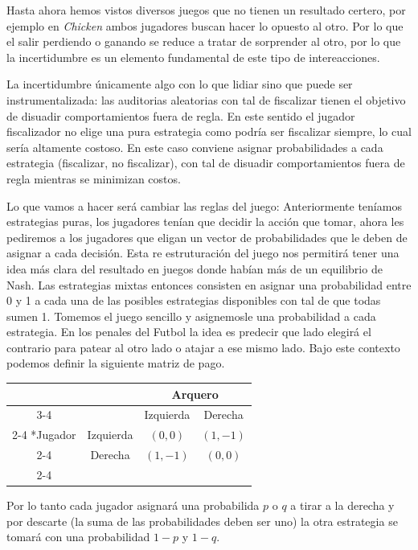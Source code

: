 Hasta ahora hemos vistos diversos juegos que no tienen un resultado certero, por ejemplo en \textit{Chicken} ambos jugadores buscan hacer lo opuesto al otro. Por lo que el salir perdiendo o ganando se reduce a tratar de sorprender al otro, por lo que la incertidumbre es un elemento fundamental de este tipo de intereacciones.  

La incertidumbre únicamente algo con lo que lidiar sino que puede ser instrumentalizada: las auditorias aleatorias con tal de fiscalizar tienen el objetivo de disuadir comportamientos fuera de regla. En este sentido el jugador fiscalizador no elige una pura estrategia como podría ser fiscalizar siempre, lo cual sería altamente costoso. En este caso conviene asignar probabilidades a cada estrategia (fiscalizar, no fiscalizar), con tal de disuadir comportamientos fuera de regla mientras se minimizan costos.

Lo que vamos a hacer será cambiar las reglas del juego: Anteriormente teníamos estrategias puras, los jugadores tenían que decidir la acción que tomar, ahora les pediremos a los jugadores que eligan un vector de probabilidades que le deben de asignar a cada decisión. Esta re estruturación del juego nos permitirá tener una idea más clara del resultado en juegos donde habían más de un equilibrio de Nash. Las estrategias mixtas entonces consisten en asignar una probabilidad entre 0 y 1 a cada una de las posibles estrategias disponibles con tal de que todas sumen 1. Tomemos el juego sencillo y asignemosle una probabilidad a cada estrategia. En los penales del Futbol la idea es predecir que lado elegirá el contrario para patear al otro lado o atajar a ese mismo lado. Bajo este contexto podemos definir la siguiente matriz de pago. 
\begin{center}
\begin{tabular}{*{4}{c|}}
  \multicolumn{2}{c}{} & \multicolumn{2}{c}{Arquero}\\\cline{3-4}
  \multicolumn{1}{c}{} &  & Izquierda & Derecha \\\cline{2-4}
  \multirow{2}*{Jugador}  & Izquierda & $(0,0)$ & $(1,-1)$ \\\cline{2-4}
  & Derecha & $(1,-1)$ & $(0,0)$ \\\cline{2-4}
\end{tabular} 
\end{center}

Por lo tanto cada jugador asignará una probabilida  $p$ o $q$ a tirar a la derecha y por descarte (la suma de las probabilidades deben ser uno) la otra estrategia se tomará con una probabilidad $1-p$ y $1-q$.


